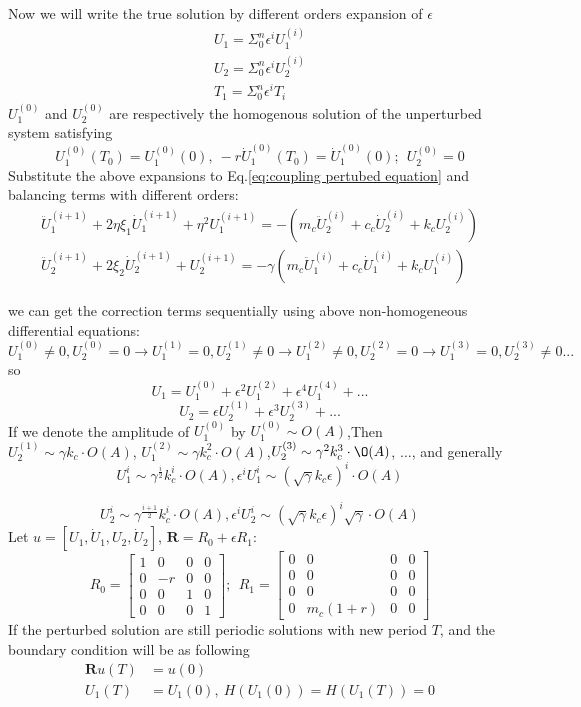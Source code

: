 \documentclass{article}
\begin{document}
	Now we will write the true solution by different orders expansion of $\epsilon$ 
	\begin{align}
		U_1=\Sigma_0^n \epsilon^{i}U_1^{(i)}\\
		U_2=\Sigma_0^n \epsilon^{i}U_2^{(i)}\\
		T_1=\Sigma_0^n \epsilon^{i}T_{i}
	\end{align}
$U_1^{(0)}$ and $U_2^{(0)}$ are respectively the homogenous solution of the unperturbed system satisfying
\begin{equation}
	U_1^{(0)}(T_0) = U_1^{(0)}(0),~ -r\dot{U}_{1}^{(0)}(T_0) = \dot{U}_{1}^{(0)}(0);~~U_{2}^{(0)}=0 \label{eq:unperturbed reset map}
\end{equation}
Substitute the above expansions to Eq.\ref{eq:coupling pertubed equation} and balancing terms with different orders:\begin{align}
	 \ddot{U}_1^{(i+1)}+2 \eta \xi_1 \dot{U}_1^{(i+1)}+\eta^2 U_1^{(i+1)}=-  ( m_c \ddot{U}_2^{(i)}+ c_c \dot{U}_2^{(i)}+ k_c U_2^{(i)})\\
	\ddot{U}_2^{(i+1)}+2 \xi_2 \dot{U}_2^{(i+1)}+ U_2^{(i+1)}= -\gamma ( m_c \ddot{U}_1^{(i)}+c_c  \dot{U}_1^{(i)}+k_c U_1^{(i)})
\end{align}

we can get the correction terms sequentially using above non-homogeneous differential equations: $U_1^{(0)}\neq0, U_2^{(0)}=0 \rightarrow U_1^{(1)}=0 ,U_2^{(1)}\neq0 \rightarrow U_1^{(2)}\neq0 ,U_2^{(2)}=0\rightarrow U_1^{(3)}=0, U_2^{(3)}\neq0... $
so \[\boxed{ U_1=U_1^{(0)} + \epsilon^2 U_1^{(2)}+ \epsilon^4 U_1^{(4)}+...}\]
\[\boxed {U_2=\epsilon U_2^{(1)}+\epsilon^3 U_2^{(3)} +...}\]
If we denote the amplitude of $U_1^{(0)}$ by $U_1^{(0)} \sim O(A)$,Then $U_2^{(1)} \sim \gamma k_c \cdot O(A)$, $U_1^{(2)} \sim \gamma k_c^2 \cdot O(A)$,$U_2^{(3)} \sim \gamma^2 k_c^3 \cdot \O(A)$, $\ldots$, and generally $$U_1^i \sim \gamma^ {\frac{i}{2}} k_c^{i} \cdot O(A), \epsilon^i U_1^i \sim (\sqrt{\gamma} k_c \epsilon)^i \cdot O(A)$$

$$U_2^i \sim \gamma^ {\frac{i+1}{2}} k_c^{i} \cdot O(A), \epsilon^i U_2^i \sim ( \sqrt{\gamma} k_c \epsilon)^i \sqrt{\gamma} \cdot O(A)$$
Let $u=[U_1,\dot{U}_1,U_2,\dot{U}_2]$, $\mathbf{R}=R_0+\epsilon R_1$:
\begin{equation}
	R_0=\begin{bmatrix}
		1 & 0  & 0 & 0\\
		0 & -r & 0 & 0\\
		0 & 0  & 1 & 0\\
		0 & 0  & 0 & 1
	\end{bmatrix};~~
	R_1=\begin{bmatrix}
		0 & 0  & 0 & 0\\
		0 & 0  & 0 & 0\\
		0 & 0  & 0 & 0\\
		0 & m_c (1+r)   & 0 & 0
	\end{bmatrix}
\end{equation}
If the perturbed solution are still periodic solutions with new period $T$, and the boundary condition will be as following
%
\begin{align}
	\label{eq:perturbed reset map}
	\mathbf{R} u(T) & = u(0)\\
	U_1(T) &=U_1(0),~H(U_1(0))=H(U_1(T))=0
\end{align}
\end{document}
